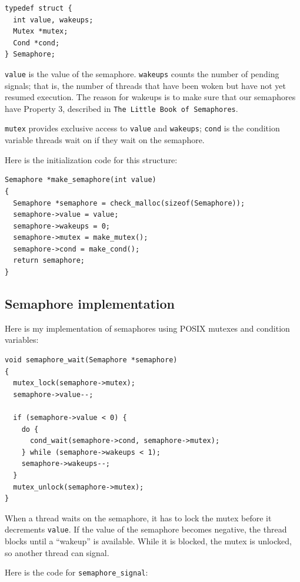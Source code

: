 \documentclass[12pt]{book}
\begin{document}
{\begin{verbatim}
typedef struct {
  int value, wakeups;
  Mutex *mutex;
  Cond *cond;
} Semaphore;
\end{verbatim}


{\tt value} is the value of the semaphore.  {\tt wakeups} counts
the number of pending signals; that is, the number of threads
that have been woken but have not yet resumed execution.  The reason
for wakeups is to make sure that our semaphores have
Property 3, described in {\tt The Little Book of Semaphores}.

{\tt mutex} provides exclusive access to {\tt value} and
{\tt wakeups}; {\tt cond} is the condition variable threads
wait on if they wait on the semaphore.

Here is the initialization code for this structure:

\begin{verbatim}
Semaphore *make_semaphore(int value)
{
  Semaphore *semaphore = check_malloc(sizeof(Semaphore));
  semaphore->value = value;
  semaphore->wakeups = 0;
  semaphore->mutex = make_mutex();
  semaphore->cond = make_cond();
  return semaphore;
}
\end{verbatim}


\subsection{Semaphore implementation}

Here is my implementation of semaphores using POSIX mutexes
and condition variables:

\begin{verbatim}
void semaphore_wait(Semaphore *semaphore)
{
  mutex_lock(semaphore->mutex);
  semaphore->value--;

  if (semaphore->value < 0) {
    do {
      cond_wait(semaphore->cond, semaphore->mutex);
    } while (semaphore->wakeups < 1);
    semaphore->wakeups--;
  }
  mutex_unlock(semaphore->mutex);
}
\end{verbatim}

When a thread waits on the semaphore, it has to lock the mutex
before it decrements {\tt value}.  If the value of the semaphore
becomes negative, the thread blocks until a ``wakeup'' is
available.  While it is blocked, the mutex is unlocked, so another
thread can signal.

Here is the code for \verb"semaphore_signal":

}
\end{document}
